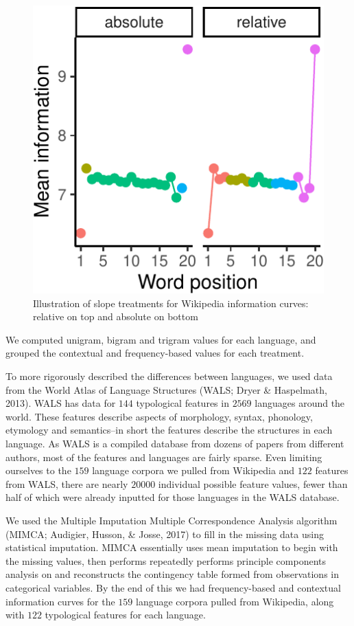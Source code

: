 \documentclass[man,floatsintext]{apa6}
\begin{document}
\begin{figure}
\centering
\includegraphics{figs/treatments-1.pdf}
\caption{\label{fig:treatments}Illustration of slope treatments for Wikipedia information curves: relative on top and absolute on bottom}
\end{figure}

We computed unigram, bigram and trigram values for each language, and grouped the contextual and frequency-based values for each treatment.

To more rigorously described the differences between languages, we used data from the World Atlas of Language Structures (WALS; Dryer \& Haspelmath, 2013). WALS has data for \(144\) typological features in \(2569\) languages around the world. These features describe aspects of morphology, syntax, phonology, etymology and semantics--in short the features describe the structures in each language. As WALS is a compiled database from dozens of papers from different authors, most of the features and languages are fairly sparse. Even limiting ourselves to the \(159\) language corpora we pulled from Wikipedia and \(122\) features from WALS, there are nearly \(20000\) individual possible feature values, fewer than half of which were already inputted for those languages in the WALS database.

We used the Multiple Imputation Multiple Correspondence Analysis algorithm (MIMCA; Audigier, Husson, \& Josse, 2017) to fill in the missing data using statistical imputation. MIMCA essentially uses mean imputation to begin with the missing values, then performs repeatedly performs principle components analysis on and reconstructs the contingency table formed from observations in categorical variables. By the end of this we had frequency-based and contextual information curves for the \(159\) language corpora pulled from Wikipedia, along with \(122\) typological features for each language.
\end{document}

